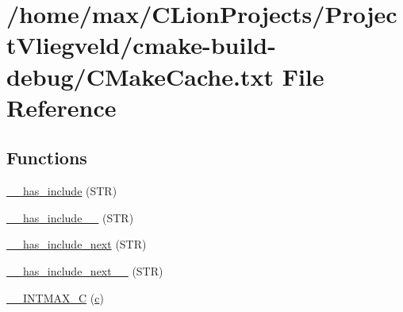 \hypertarget{CMakeCache_8txt}{}\section{/home/max/\+C\+Lion\+Projects/\+Project\+Vliegveld/cmake-\/build-\/debug/\+C\+Make\+Cache.txt File Reference}
\label{CMakeCache_8txt}
\subsection*{Functions}
\begin{DoxyCompactItemize}
\item 
\hyperlink{CMakeCache_8txt_a15033d43fd4881ecb41d0a9ef3f98c8b}{\+\_\+\+\_\+has\+\_\+include} (S\+TR)
\item 
\hyperlink{CMakeCache_8txt_a97e2b5b7d48e0c704f01b437bbb41bc3}{\+\_\+\+\_\+has\+\_\+include\+\_\+\+\_\+} (S\+TR)
\item 
\hyperlink{CMakeCache_8txt_a6bc72b80bcdbfe30be5d38536affde6f}{\+\_\+\+\_\+has\+\_\+include\+\_\+next} (S\+TR)
\item 
\hyperlink{CMakeCache_8txt_ac96b06945e62d6ea6764b6d86745ec26}{\+\_\+\+\_\+has\+\_\+include\+\_\+next\+\_\+\+\_\+} (S\+TR)
\item 
\hyperlink{CMakeCache_8txt_a2f10a19f2682f0eb61615edae3fa69ef}{\+\_\+\+\_\+\+I\+N\+T\+M\+A\+X\+\_\+C} (\hyperlink{html_2jquery_8js_abce695e0af988ece0826d9ad59b8160d}{c})
\end{DoxyCompactItemize}
